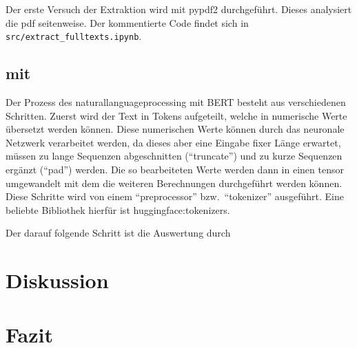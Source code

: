 \documentclass[
german,
]{bachelor}
\begin{document}
Der erste Versuch der Extraktion wird mit \gls{pypdf2} durchgeführt.
Dieses analysiert die \gls{pdf} seitenweise.
Der kommentierte Code findet sich in \texttt{src/extract\_fulltexts.ipynb}.

\subsection{ mit }
Der Prozess des \gls{naturallanguageprocessing} mit \gls{BERT} besteht aus verschiedenen Schritten.
Zuerst wird der Text in Tokens aufgeteilt,
welche in numerische Werte übersetzt werden können.
Diese numerischen Werte können durch das neuronale Netzwerk verarbeitet werden,
da dieses aber eine Eingabe fixer Länge erwartet,
müssen zu lange Sequenzen abgeschnitten (\enquote{truncate})
und zu kurze Sequenzen ergänzt (\enquote{pad}) werden.
Die so bearbeiteten Werte werden dann in einen \gls{tensor} umgewandelt
mit dem die weiteren Berechnungen durchgeführt werden können.
Diese Schritte wird von einem \enquote{preprocessor}
bzw.\, \enquote{tokenizer} ausgeführt.
\autocite{huggingface:docs:Transformers:preprocessing}
Eine beliebte Bibliothek hierfür ist \gls{huggingface:tokenizers}.



Der darauf folgende Schritt ist die Auswertung durch


\section{Diskussion}

\section{Fazit}

\appendix

\printunsrtglossaries
\end{document}
